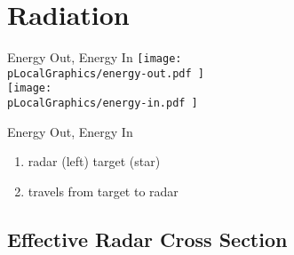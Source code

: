 % 

\section{Radiation}

\begin{frame}{Energy Out, Energy In}
    \centering
    \texttt{[image:  \\pLocalGraphics/energy-out.pdf ]} \\[1em]
    \texttt{[image:  \\pLocalGraphics/energy-in.pdf ]} \\[1em]
\end{frame}

\begin{frame}{Energy Out, Energy In}
    	\begin{enumerate}
		\item radar (left) {\color{red}{irradiates}} target (star)
		\item {\color{blue}{backscatter}} travels from target to radar
	\end{enumerate}

\end{frame}


\subsection{Effective Radar Cross Section}

